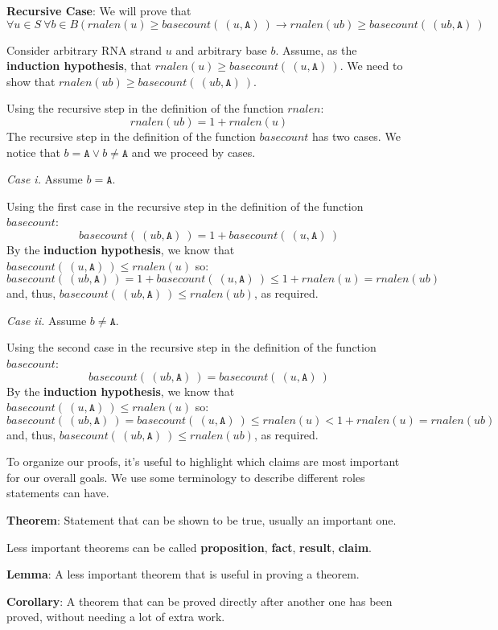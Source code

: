 \documentclass[12pt, oneside]{article}
\newcommand{\A}[0]{\texttt{A}}
\begin{document}
\vspace{100pt}

{\bf Recursive Case}: We will prove that 
\[
    \forall u \in S ~\forall b \in B ~( ~rnalen(u) \geq basecount(~(u, \A)~) \to 
    rnalen(ub) \geq basecount(~(ub, \A)~)
\]

Consider arbitrary RNA strand $u$ and arbitrary base $b$. Assume, as the {\bf induction hypothesis},
that $rnalen(u) \geq basecount(~(u,\A)~)$. We need to show that $rnalen(ub) \geq basecount(~(ub, \A)~)$.

Using the recursive step in the definition of the function $rnalen$:
\[
    rnalen(ub) = 1 + rnalen(u)
\]
The recursive step in the definition of the function $basecount$ has two cases. We notice that 
$b = \A \lor b \neq \A$ and we proceed by cases.

{\it Case i.} Assume $b = \A$.

Using the first case in the recursive step in the definition of the function $basecount$:
\[
    basecount(~(ub, \A)~) = 1 + basecount(~(u,\A)~)
\]
By the {\bf induction hypothesis}, we know that $basecount(~(u,\A)~) \leq rnalen(u)$ so:
\[
    basecount(~(ub, \A)~) = 1 + basecount(~(u,\A)~) \leq 1 + rnalen(u) = rnalen (ub)
\]
and, thus, $basecount(~(ub,\A)~) \leq rnalen(ub)$, as required.

{\it Case ii.} Assume $b \neq \A$. 

Using the second case in the recursive step in the definition of the function $basecount$:
\[
    basecount(~(ub, \A)~) = basecount(~(u,\A)~)
\]
By the {\bf induction hypothesis}, we know that $basecount(~(u,\A)~) \leq rnalen(u)$ so:
\[
    basecount(~(ub, \A)~) = basecount(~(u,\A)~) \leq rnalen(u) < 1 + rnalen(u) = rnalen (ub)
\]
and, thus, $basecount(~(ub,\A)~) \leq rnalen(ub)$, as required.
 \newpage


To organize our proofs, it's useful to highlight which claims are most important for 
our overall goals.
We use some terminology to describe different roles statements can have.

{\bf Theorem}: Statement that can be shown to be true, usually an important one.

Less important theorems can be called {\bf proposition}, {\bf fact}, {\bf result}, {\bf claim}.

{\bf Lemma}: A less important theorem that is useful in proving a theorem.
 
{\bf Corollary}: A theorem that can be proved directly after another one has been proved, 
without needing a lot of extra work.
\end{document}

